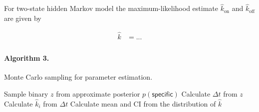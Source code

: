 For two-state hidden Markov model the maximum-likelihood estimate $\hat{k}_\mathrm{on}$ and $\hat{k}_\mathrm{off}$ are given by

\begin{subequations}
\begin{align}
    \hat{k} &= ... \\
\end{align}
\end{subequations}

\paragraph{Algorithm 3.} Monte Carlo sampling for parameter estimation. \\
\begin{algorithmic}[1]
    \State Sample binary $z$ from approximate posterior $p(\mathsf{specific})$
    \State Calculate $\Delta t$ from $z$
    \State Calculate $\hat{k}_i$ from $\Delta t$
\EndFor{}
\State Calculate mean and CI from the distribution of $\hat{k}$
\end{algorithmic}


